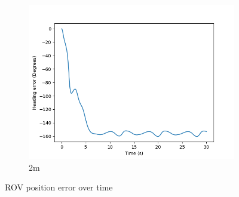 \documentclass[class=article, crop=false]{standalone}
\begin{document}
\begin{figure}
\begin{subfigure}[b]{0.48\textwidth}
        \includegraphics{scenario1/rov-100m/2.0m/usv_heading_error_uncontrolled}
        \caption{2m}
        \label{}
    \end{subfigure}

    \caption{ROV position error over time}
\end{figure}
\end{document}
